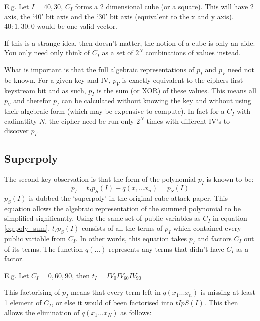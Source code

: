 \documentclass{report}
\let\Oldsubsection\subsection
\renewcommand{\subsection}{\FloatBarrier\Oldsubsection}
\begin{document}
E.g. Let $I = {40, 30}$, $C_I$ forms a 2 dimensional cube (or a square). This will have 2 axis, the `40' bit axis and the `30' bit axis (equivalent to the x and y axis). ${40:1, 30:0}$ would be one valid vector.

\begin{figure}[h]
\end{figure}

If this is a strange idea, then doesn't matter, the notion of a cube is only an aide. You only need only think of $C_I$ as a set of $2^N$ combinations of values instead.

What is important is that the full algebraic representations of $p_I$ and $p_V$ need not be known. For a given key and IV, $p_V$ is exactly equivalent to the ciphers first keystream bit and as such, $p_I$ is the sum (or XOR) of these values. This means all $p_V$ and therefor $p_I$ can be calculated without knowing the key and without using their algebraic form (which may be expensive to compute). In fact for a $C_I$ with cadinatlity $N$, the cipher need be run only $2^N$ times with different IV's to discover $p_I$.

\subsection{Superpoly}
The second key observation is that the form of the polynomial $p_I$ is known to be:
\begin{equation} \label{eq:superpoly}
p_I = t_Ip_S(I)+q(x_1...x_n)=p_S(I)
\end{equation}
$p_S(I)$ is dubbed the `superpoly' in the original cube attack paper. This equation allows the algebraic representation of the summed polynomial to be simplified significantly. Using the same set of public variables as $C_I$ in equation \ref{eq:poly_sum}, $t_Ip_S(I)$ consists of all the terms of $p_I$ which contained every public variable from $C_I$. In other words, this equation takes $p_I$ and factors $C_I$ out of its terms. The function $q(...)$ represents any terms that didn't have $C_I$ as a factor.

E.g. Let $C_I={0, 60, 90}$, then  $t_I = IV_{0}IV_{60}IV_{90}$

This factorising of $p_I$ means that every term left in $q(x_1...x_n)$ is missing at least 1 element of $C_I$, or else it would of been factorised into $tIpS(I)$. This then allows the elimination of $q(x_1...x_N)$ as follows:
\end{document}
